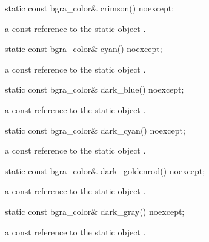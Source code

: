 \begin{itemdecl}
static const bgra_color& crimson() noexcept;
\end{itemdecl}
\begin{itemdescr}
\pnum
\returns
a const reference to the static  object .
\end{itemdescr}

\begin{itemdecl}
static const bgra_color& cyan() noexcept;
\end{itemdecl}
\begin{itemdescr}
\pnum
\returns
a const reference to the static  object .
\end{itemdescr}

\begin{itemdecl}
static const bgra_color& dark_blue() noexcept;
\end{itemdecl}
\begin{itemdescr}
\pnum
\returns
a const reference to the static  object .
\end{itemdescr}

\begin{itemdecl}
static const bgra_color& dark_cyan() noexcept;
\end{itemdecl}
\begin{itemdescr}
\pnum
\returns
a const reference to the static  object .
\end{itemdescr}

\begin{itemdecl}
static const bgra_color& dark_goldenrod() noexcept;
\end{itemdecl}
\begin{itemdescr}
\pnum
\returns
a const reference to the static  object .
\end{itemdescr}

\begin{itemdecl}
static const bgra_color& dark_gray() noexcept;
\end{itemdecl}
\begin{itemdescr}
\pnum
\returns
a const reference to the static  object .
\end{itemdescr}

